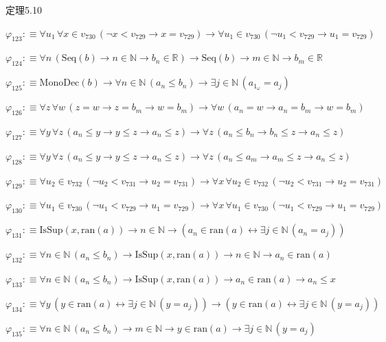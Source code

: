\begin{fullproof}{定理5.10}
\begin{abbrevlist}
\item $\varphi_{123} :\equiv \forall u_{1}\,\forall x \in v_{730}\,(\neg x < v_{729} \to x = v_{729}) \to \forall u_{1} \in v_{730}\,(\neg u_{1} < v_{729} \to u_{1} = v_{729})$
\item $\varphi_{124} :\equiv \forall n\,(\mathrm{Seq}(b) \to n \in \mathbb{N} \to b_{n} \in \mathbb{R}) \to \mathrm{Seq}(b) \to m \in \mathbb{N} \to b_{m} \in \mathbb{R}$
\item $\varphi_{125} :\equiv \mathrm{MonoDec}(b) \to \forall n \in \mathbb{N}\,(a_{n} \leq b_{n}) \to \exists j \in \mathbb{N}\,(a_{1_{\omega}} = a_{j})$
\item $\varphi_{126} :\equiv \forall z\,\forall w\,(z = w \to z = b_{m} \to w = b_{m}) \to \forall w\,(a_{n} = w \to a_{n} = b_{m} \to w = b_{m})$
\item $\varphi_{127} :\equiv \forall y\,\forall z\,(a_{n} \leq y \to y \leq z \to a_{n} \leq z) \to \forall z\,(a_{n} \leq b_{n} \to b_{n} \leq z \to a_{n} \leq z)$
\item $\varphi_{128} :\equiv \forall y\,\forall z\,(a_{n} \leq y \to y \leq z \to a_{n} \leq z) \to \forall z\,(a_{n} \leq a_{m} \to a_{m} \leq z \to a_{n} \leq z)$
\item $\varphi_{129} :\equiv \forall u_{2} \in v_{732}\,(\neg u_{2} < v_{731} \to u_{2} = v_{731}) \to \forall x\,\forall u_{2} \in v_{732}\,(\neg u_{2} < v_{731} \to u_{2} = v_{731})$
\item $\varphi_{130} :\equiv \forall u_{1} \in v_{730}\,(\neg u_{1} < v_{729} \to u_{1} = v_{729}) \to \forall x\,\forall u_{1} \in v_{730}\,(\neg u_{1} < v_{729} \to u_{1} = v_{729})$
\item $\varphi_{131} :\equiv \mathrm{IsSup}(x,\mathrm{ran}(a)) \to n \in \mathbb{N} \to (a_{n} \in \mathrm{ran}(a) \leftrightarrow \exists j \in \mathbb{N}\,(a_{n} = a_{j}))$
\item $\varphi_{132} :\equiv \forall n \in \mathbb{N}\,(a_{n} \leq b_{n}) \to \mathrm{IsSup}(x,\mathrm{ran}(a)) \to n \in \mathbb{N} \to a_{n} \in \mathrm{ran}(a)$
\item $\varphi_{133} :\equiv \forall n \in \mathbb{N}\,(a_{n} \leq b_{n}) \to \mathrm{IsSup}(x,\mathrm{ran}(a)) \to a_{n} \in \mathrm{ran}(a) \to a_{n} \leq x$
\item $\varphi_{134} :\equiv \forall y\,(y \in \mathrm{ran}(a) \leftrightarrow \exists j \in \mathbb{N}\,(y = a_{j})) \to (y \in \mathrm{ran}(a) \leftrightarrow \exists j \in \mathbb{N}\,(y = a_{j}))$
\item $\varphi_{135} :\equiv \forall n \in \mathbb{N}\,(a_{n} \leq b_{n}) \to m \in \mathbb{N} \to y \in \mathrm{ran}(a) \to \exists j \in \mathbb{N}\,(y = a_{j})$

\end{abbrevlist}
\end{fullproof}
